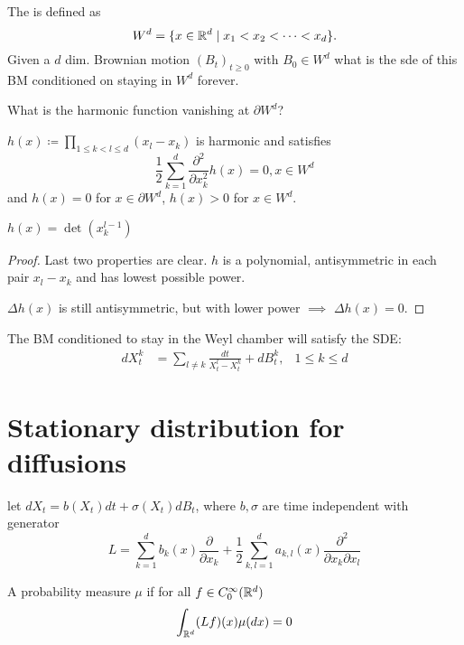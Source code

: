 
\begin{example}\label{ex:2.14}
    The  is defined as \[W^d=\{x\in\mathbb{R}^d\mid x_1<x_2<\dots<x_d\}.\]
    Given a $d$ dim. Brownian motion $(B_t)_{t\geq 0}$ with $B_0\in W^d$ what is the sde of 
    this BM conditioned on staying in $W^d$ forever.

    What is the harmonic function vanishing at $\partial W^d$?

\end{example}

\begin{lemma}\label{lem:2.15}
    $h(x)\coloneqq \prod_{1\leq k <l\leq d}(x_l-x_k)$ is harmonic and satisfies 
    \[\frac{1}{2}\sum_{k=1}^d\frac{\partial^2}{\partial x_k^2}h(x)=0,x\in W^d\]
    and $h(x)=0$ for $x\in \partial W^d$, $h(x)>0$ for $x\in W^d$.
\end{lemma}

\begin{remark}
    $h(x)=\det(x_k^{l-1})$
\end{remark}

\begin{proof}
    Last two properties are clear. $h$ is a polynomial, antisymmetric in each pair $x_l-x_k$ and has 
    lowest possible power.

    $\Delta h(x)$ is still antisymmetric, but with lower power $\implies$ $\Delta h(x)=0$.
\end{proof}

The BM conditioned to stay in the Weyl chamber will satisfy the SDE:
\begin{align*}
    dX_t^k &= \sum_{l\neq k}\frac{dt}{X_t^l-X_t^k}+dB_t^k, & 1\leq k\leq d
\end{align*}

\section{Stationary distribution for diffusions}

let $dX_t=b(X_t)dt+\sigma(X_t)dB_t$, where $b,\sigma$ are time independent with generator 
\[L=\sum_{k=1}^db_k(x)\frac{\partial}{\partial x_k}+\frac{1}{2}\sum_{k,l=1}^da_{k,l}(x)\frac{\partial^2}{\partial x_k\partial x_l}\]


\begin{definition}\label{def:2.16}
    A probability measure $\mu$  if for all $f\in C_0^\infty(\mathbb{R}^d)$
    \[\int_{\mathbb{R}^d} (Lf)(x)\mu(dx)=0\]
\end{definition}

